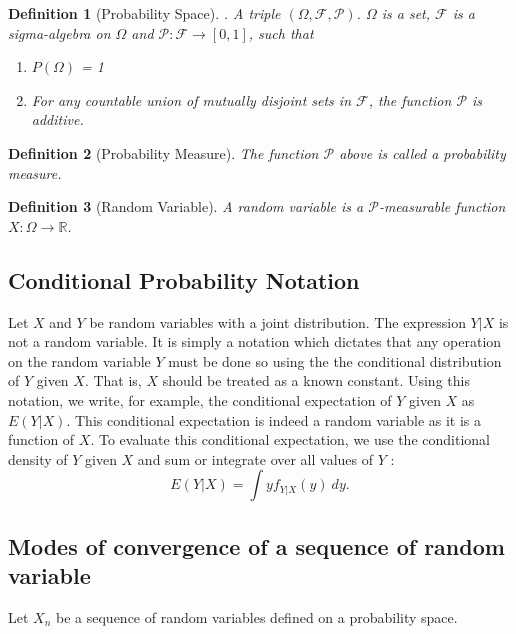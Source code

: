 \documentclass{amsart}
\theoremstyle{plain}
\newtheorem{definition}{Definition}
\numberwithin{equation}{section}
\begin{document}
\begin{definition}[Probability Space]. 
A triple $(\Omega, \mathcal{F}, \mathcal{P})$.
$\Omega$ is a set, $\mathcal{F}$ is a sigma-algebra
on $\Omega$ and $\mathcal{P}: \mathcal{F} \to [0, 1]$,
such that 
\begin{enumerate}
	\item $P(\Omega)$ = 1
	\item For any countable union of mutually disjoint sets in $\mathcal{F}$, the 
	function $\mathcal{P}$ is additive.
\end{enumerate}
\end{definition}
\begin{definition}[Probability Measure]
The function $\mathcal{P}$ above is called a probability measure.
\end{definition}

\begin{definition}[Random Variable]
A random variable is a $\mathcal{P}$-measurable function $X:\Omega \to \mathbb{R}$.
\end{definition}

\subsection*{Conditional Probability Notation}
Let $X$ and $Y$ be random variables with 
a joint distribution. The expression $Y|X$ is not a random
variable. It is simply a notation which dictates that any 
operation on the random variable $Y$ must be done so
using the the conditional distribution of 
$Y$ given $X$. That is, $X$ should 
be treated as a known constant. 
Using this notation, we write, for example,  the conditional expectation of 
$Y$ given $X$ as $E(Y|X)$. 
This conditional expectation is indeed a random variable 
as it is a function of $X$. To evaluate this conditional expectation,
we use the conditional density of $Y$ given $X$ and sum or 
integrate over all values of $Y$ \cite{blitzstein_harvard_110_final_review}:
\begin{equation*}
E(Y|X) = \int y f_{Y|X}(y) \: dy.
\end{equation*}


\subsection{Modes of convergence of a sequence of random variable}
Let $X_n$ be a sequence of random variables defined on a probability 
space. 
\end{document}
